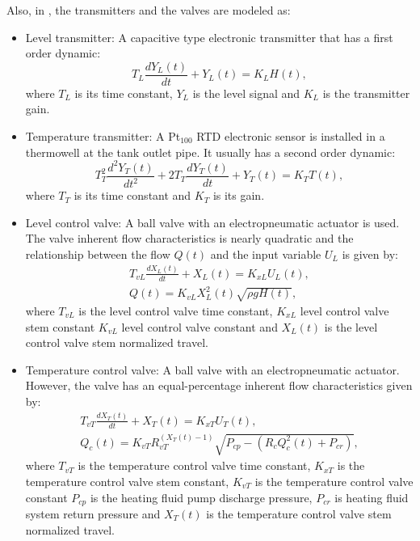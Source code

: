 Also, in \citet{Alfaro2016}, the transmitters and the valves are modeled as:
\begin{itemize}
	\item Level transmitter: A capacitive type electronic transmitter that has a first order dynamic:
		\begin{equation*}
			T_L \frac{d Y_L(t)}{dt} + Y_L(t) = K_L H(t),
		\end{equation*}
		where $T_L$ is its time constant, $Y_L$ is the level signal and $K_L$ is the transmitter gain.
	\item Temperature transmitter: A Pt$_{100}$ RTD electronic sensor is installed in a thermowell at the tank outlet pipe. It usually has a second order dynamic:
		\begin{equation*}
			T_{T}^2 \frac{d^2 Y_T(t)}{dt^2} + 2T_T \frac{d Y_T(t)}{dt} + Y_T(t) = K_T T(t),
		\end{equation*}
		where $T_T$ is its time constant and $K_T$ is its gain.
	\item Level control valve: A ball valve with an electropneumatic actuator is used. The valve inherent flow characteristics is nearly quadratic and the relationship between the flow $Q(t)$ and the input variable $U_L$ is given by:
		\begin{align*}
			T_{vL} \frac{d X_L(t)}{dt} + X_L(t) = K_{xL} U_L(t),\\
			Q(t) = K_{vL} X_L^2(t)\sqrt{\rho g H(t)},
		\end{align*}
		where $T_{vL}$ is the level control valve time constant, $K_{xL}$ level control valve stem constant $K_{vL}$ level control valve constant and $X_L(t)$ is the level control valve stem normalized travel.
	\item Temperature control valve: A ball valve with an electropneumatic actuator. However, the valve has an equal-percentage inherent flow characteristics given by:
		\begin{align*}
			T_{vT} \frac{d X_T(t)}{dt} + X_T(t) = K_{xT} U_T(t),\\
			Q_c(t) = K_{vT}R_{vT}^{\left( X_T(t) -1 \right) } \sqrt{P_{cp} - \left(R_c Q^2_c(t)+P_{cr} \right) },
		\end{align*}
		where $T_{vT}$ is the temperature control valve time constant, $K_{xT}$ is the temperature control valve stem constant, $K_{vT}$ is the temperature control valve constant $P_{cp}$ is the heating fluid pump discharge pressure, $P_{cr}$ is heating fluid system return pressure and $X_T(t)$ is the temperature control valve stem normalized travel.
\end{itemize}

